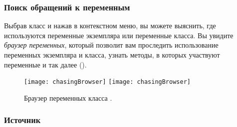 \documentclass[a4paper,10pt,twoside]{book}
\begin{document}
\subsubsection{Поиск обращений к переменным}


Выбрав класс и нажав  в контекстном меню, вы можете выяснить, где используются переменные экземпляра или переменные класса. Вы увидите \emph{браузер переменных}, который позволит вам проследить использование переменных экземпляра и класса, узнать методы, в которых участвуют переменные и так далее ().

\begin{figure}[btp]
	\begin{center}
	\ifluluelse
		{\texttt{[image: chasingBrowser]}}
		{\texttt{[image: chasingBrowser]}}
	\end{center}
	\caption{Браузер переменных класса .}
\end{figure}

\subsubsection{Источник}

\end{document}
